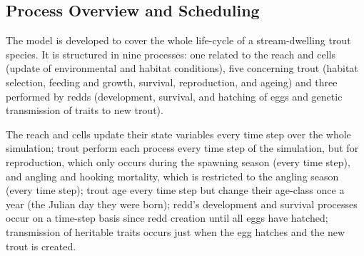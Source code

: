 \documentclass[
  man,
  10pt,
  a4paper,
  floatsintext
]{apa7}
\begin{document}
\subsection{Process Overview and Scheduling}

\begin{guidingbox}
  \begin{tcbitemize}
    \item[\gddarkredb{\arrowbullet}] 
    \item[\gddarkcornflowerblueb{\arrowbullet}] 
    \item[\gddarkgreenb{\arrowbullet}] 
  \end{tcbitemize}
\end{guidingbox}


The model is developed to cover the whole life-cycle of a stream-dwelling trout species. It is structured in nine processes: one related to the reach and cells (update of environmental and habitat conditions), five concerning trout (habitat selection, feeding and growth, survival, reproduction, and ageing) and three performed by redds (development, survival, and hatching of eggs and genetic transmission of traits to new trout).

{
  \color{gddarkcornflowerblueb}
  The reach and cells update their state variables every time step over the whole simulation; trout perform each process every time step of the simulation, but for reproduction, which only occurs during the spawning season (every time step), and angling and hooking mortality, which is restricted to the angling season (every time step); trout age every time step but change their age-class once a year (the Julian day they were born); redd's development and survival processes occur on a time-step basis since redd creation until all eggs have hatched; transmission of heritable traits occurs just when the egg hatches and the new trout is created.
}
\end{document}
